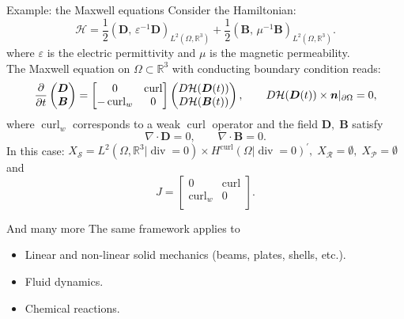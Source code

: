 \documentclass[aspectratio=169]{beamer}
\renewcommand{\div}{\operatorname{div}}
\DeclareMathOperator*{\curl}{curl}
\newcommand{\bbR}{\mathbb{R}}
\newcommand{\inpr}[3][]{\ensuremath{( #2, \, #3 )_{#1}}}
\begin{document}
\begin{frame}{Example: the Maxwell equations}
	Consider the Hamiltonian:
	\begin{equation*}
		\mathcal{H} = \frac{1}{2} \inpr[L^2(\Omega, \bbR^3)]{\bm{D}}{\varepsilon^{-1}\bm{D}} + \frac{1}{2} \inpr[L^2(\Omega, \bbR^3)]{\bm{B}}{\mu^{-1}\bm{B}}.
	\end{equation*}
where  $\varepsilon$ is the electric permittivity and $\mu$ is the magnetic permeability.\\
\vspace{.5cm}
	The Maxwell equation on $\Omega \subset \bbR^3$ with conducting boundary condition reads:
	\begin{equation*}
		\diffp{}{t}\begin{pmatrix}
			\bm{D} \\ \bm{B} 
		\end{pmatrix} = 
		\begin{bmatrix}
			0 & \curl \\
			-\curl_w & 0 \\
		\end{bmatrix}
		\begin{pmatrix}
			D\mathcal{H}(\bm{D}(t)) \\
			D\mathcal{H}(\bm{B}(t)) \\
		\end{pmatrix},\qquad D\mathcal{H}(\bm{D}(t)) \times \bm{n}|_{\partial\Omega}=0,
	\end{equation*}
	where $\curl_w$ corresponds to a weak $\curl$ operator and the field $\bm{D}, \; \bm{B}$ satisfy
	\begin{equation*}
			\nabla \cdot \bm{D}= 0, \qquad	\nabla \cdot \bm{B}= 0.
	\end{equation*}
In this case: $X_{\mathcal{S}}= L^2(\Omega, \bbR^3|\div=0) \times H^{\curl}(\Omega| \div=0)^{'}, \; X_{\mathcal{R}} = \emptyset, \; X_{\mathcal{P}}= \emptyset$ and
\begin{equation*}
	J = \begin{bmatrix}
		0 & \curl \\
		\curl_w & 0 \\
	\end{bmatrix}.
\end{equation*}


	
	
\end{frame}

\begin{frame}{And many more}
	The same framework applies to
	\begin{itemize}
		\item Linear and non-linear solid mechanics (beams, plates, shells, etc.).\\
		\item Fluid dynamics. \\
		\item Chemical reactions.
	\end{itemize}
\end{frame}
\end{document}
